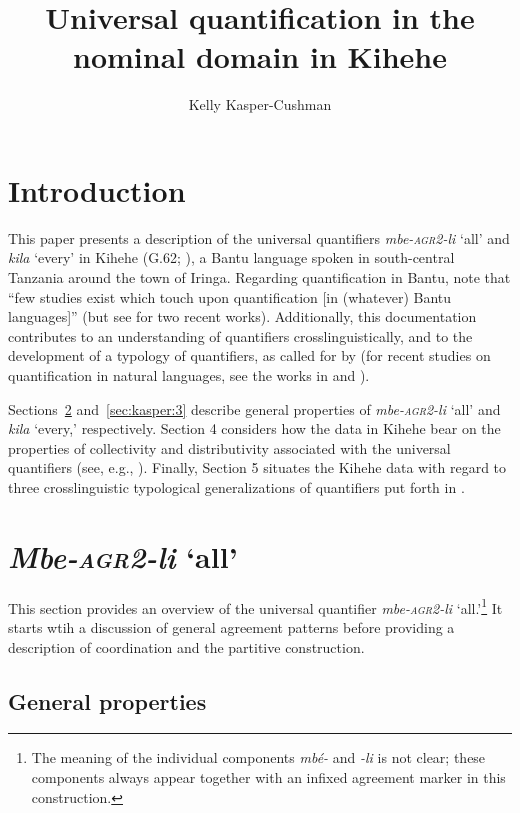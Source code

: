 \documentclass[output=paper,modfonts,nonflat]{langsci/langscibook}
\title{Universal quantification in the nominal domain in Kihehe}
\author{Kelly Kasper-Cushman\affiliation{Indiana University}}
\begin{document}
\maketitle

\section{Introduction}

This paper presents a description of the universal quantifiers \textit{mbe-\textsc{agr2}-li} `all' and \textit{kila} `every' in Kihehe (G.62; \citealt{maho09}), a Bantu language spoken in south-central Tanzania around the town of Iringa.
Regarding quantification in Bantu, \citealt[383]{zerbian08} note that ``few studies exist which touch upon quantification [in (whatever) Bantu languages]'' (but see \citealt{landman16, landmanip} for two recent works). Additionally, this documentation contributes to an understanding of quantifiers crosslinguistically, and to the development of a typology of quantifiers, as called for by \cite{matthewson13} (for recent studies on quantification in natural languages, see the works in \citealt{gil13, keenan12, matthewson08} and \citealt{paperno17}).

Sections~\ref{sec:kasper:2} and~\ref{sec:kasper:3} describe general properties of \textit{mbe-\textsc{agr2}-li} `all' and \textit{kila} `every,' respectively. Section 4 considers how the data in Kihehe bear on the properties of collectivity and distributivity associated with the universal quantifiers (see, e.g., \citet{szabolcsi10}). Finally, Section 5 situates the Kihehe data with regard to three crosslinguistic typological generalizations of quantifiers put forth in \citealt{matthewson13}. 


\section{\emph{Mbe-\textsc{agr2}-li} `all'}\label{sec:kasper:2}

This section provides an overview of the universal quantifier \emph{mbe-\textsc{agr2}-li} `all.'\footnote{The meaning of the individual components \textit{mbé-} and \textit{-li} is not clear; these components always appear together with an infixed agreement marker in this construction.} It starts wtih a discussion of general agreement patterns before providing a description of coordination and the partitive construction. 

\subsection{General properties}
\end{document}
